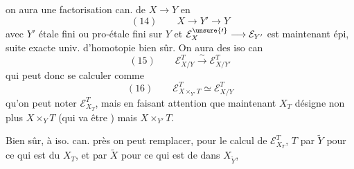 

on aura une factorisation can. de $X\longrightarrow Y$ en
\[
(14)\qquad X\longrightarrow Y'\longrightarrow Y
\]
avec $Y'$ étale fini ou pro-étale fini sur $Y$ et $\mathcal E_X^{\unsure{\prime}}\longrightarrow\mathcal E_{Y'}$ est maintenant épi,   suite exacte univ. d'homotopie bien sûr. On aura des iso can
\[
(15)\qquad \mathcal E_{X/Y}^T\xrightarrow{\sim}\mathcal E_{X/Y'}^T
\]
qui peut donc se calculer comme
\[
(16)\qquad \mathcal E_{X\times_{Y'}T}^T\simeq\mathcal E_{X/Y}^T
\]
qu'on peut noter $\mathcal E_{X_T}^T$, mais en faisant attention que maintenant $X_T$ désigne non plus $X\times_YT$ (qui va être  ) mais $X\times_{Y'}T$.

Bien sûr, à iso. can. près on peut  remplacer, pour le calcul de $\mathcal E_{X_T}^T$, $T$ par $\widetilde Y$ pour ce qui est du $X_T$, et par $\widetilde X$ pour ce qui est de  dans $X_{\widetilde Y}$,


